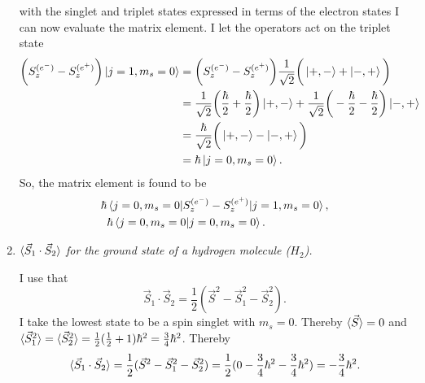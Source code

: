 \begin{example}
\begin{enumerate}
		with the singlet and triplet states expressed in terms of the electron states I can now evaluate the matrix element. I let the operators act on the triplet state
		\begin{equation}
			\begin{split}
				\bigg(S_z^{(e^-)}-S_z^{(e^+)}\bigg)\ket{j=1,m_s=0}&=\bigg(S_z^{(e^-)}-S_z^{(e^+)}\bigg)\frac{1}{\sqrt{2}}\bigg(\ket{+,-}+\ket{-,+}\bigg)\\
				&=\frac{1}{\sqrt{2}}\bigg(\frac{\hbar}{2}+\frac{\hbar}{2}\bigg)\ket{+,-}+\frac{1}{\sqrt{2}}\bigg(-\frac{\hbar}{2}-\frac{\hbar}{2}\bigg)\ket{-,+}\\
				&=\frac{\hbar}{\sqrt{2}}\bigg(\ket{+,-}-\ket{-,+}\bigg)\\
				&=\hbar\ket{j=0,m_s=0}.
			\end{split}
		\end{equation} 
		So, the matrix element is found to be
		\begin{equation}
			\begin{split}
				\hbar&	\braket{j=0,m_s=0|S_z^{(e^-)}-S_z^{(e^+)}|j=1,m_s=0},\\
				&\hbar\braket{j=0,m_s=0|j=0,m_s=0}.
			\end{split}
		\end{equation} 
		
		\item \emph{$\braket{\vec{S}_{1}\cdot\vec{S}_{2}}$ for the ground state of a hydrogen molecule ($H_2$).} \newline
		
		I use that
		\begin{equation}
			\vec{S}_{1}\cdot\vec{S}_{2}=\frac{1}{2}(\vec{S}^2-\vec{S}_1^2-\vec{S}_2^2).
		\end{equation} 
		I take the lowest state to be a spin singlet with $m_s=0$. Thereby $\braket{\vec{S}}=0$ and $\braket{\vec{S}_1^2}=\braket{\vec{S}_2^2}=\frac{1}{2}(\frac{1}{2}+1)\hbar^2=\frac{3}{4}\hbar^2$. Thereby
		\begin{equation}
			\braket{\vec{S}_{1}\cdot\vec{S}_{2}}=\frac{1}{2}(\vec{S}^2-\vec{S}_1^2-\vec{S}_2^2)=\frac{1}{2}(0-\frac{3}{4}\hbar^2-\frac{3}{4}\hbar^2)=-\frac{3}{4}\hbar^2.
		\end{equation} 
	\end{enumerate}
\end{example}


